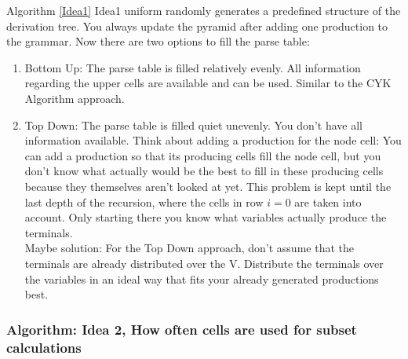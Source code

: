 Algorithm \ref{Idea1} Idea1 uniform randomly generates a predefined structure of the derivation tree. You always update the pyramid after adding one production to the grammar. Now there are two options to fill the parse table:
\begin{enumerate}
	\item Bottom Up: The parse table is filled relatively evenly. All information regarding the upper cells are available and can be used. Similar to the CYK Algorithm approach.
	\item Top Down: The parse table is filled quiet unevenly. You don't have all information available. Think about adding a production for the node cell: You can add a production so that its producing cells fill the node cell, but you don't know what actually would be the best to fill in these producing cells because they themselves aren't looked at yet. This problem is kept until the last depth of the recursion, where the cells in row $i=0$ are taken into account. Only starting there you know what variables actually produce the terminals.\\
	Maybe solution: For the Top Down approach, don't assume that the terminals are already distributed over the V. Distribute the terminals over the variables in an ideal way that fits your already generated productions best.
\end{enumerate}

\pagebreak

\subsubsection{Algorithm: Idea 2, How often cells are used for subset calculations}

\pagebreak


